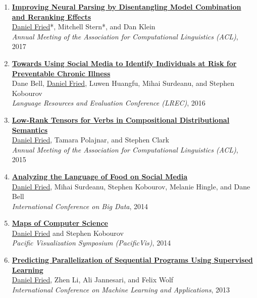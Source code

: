 \begin{enumerate}[leftmargin=-1mm,partopsep=0pt]
\item \href{https://arxiv.org/abs/1707.03058}{\textbf{Improving Neural Parsing by Disentangling Model Combination and Reranking Effects}} \\
  \underline{Daniel Fried}*, Mitchell Stern*, and Dan Klein\\
  \emph{Annual Meeting of the Association for Computational Linguistics (ACL)}, 2017

\item \href{http://arxiv.org/abs/1603.03784}{\textbf{Towards Using Social Media to Identify Individuals at Risk for Preventable Chronic Illness}} \\
  Dane Bell, \underline{Daniel Fried}, Luwen Huangfu, Mihai Surdeanu, and Stephen Kobourov\\
  \emph{Language Resources and Evaluation Conference (LREC)}, 2016

\item \href{https://people.eecs.berkeley.edu/~dfried/papers/FPC-verb_tensors.pdf}{\textbf{Low-Rank Tensors for Verbs in Compositional Distributional Semantics}} \\
  \underline{Daniel Fried}, Tamara Polajnar, and Stephen Clark\\
  \emph{Annual Meeting of the Association for Computational Linguistics (ACL)}, 2015

\item \href{https://people.eecs.berkeley.edu/~dfried/papers/Fried-bigdata2014.pdf}{\textbf{Analyzing the Language of Food on Social Media}} \\
  \underline{Daniel Fried}, Mihai Surdeanu, Stephen Kobourov, Melanie Hingle, and Dane Bell\\
  \emph{International Conference on Big Data}, 2014

\item \href{https://arxiv.org/abs/1304.2681}{\textbf{Maps of Computer Science}} \\
  \underline{Daniel Fried} and Stephen Kobourov\\
  \emph{Pacific Visualization Symposium (PacificVis)}, 2014

\item \href{https://people.eecs.berkeley.edu/~dfried/papers/Fried-ICMLA2013.pdf}{\textbf{Predicting Parallelization of Sequential Programs Using Supervised Learning}} \\
  \underline{Daniel Fried}, Zhen Li, Ali Jannesari, and Felix Wolf\\
  \emph{International Conference on Machine Learning and Applications}, 2013


\end{enumerate}
